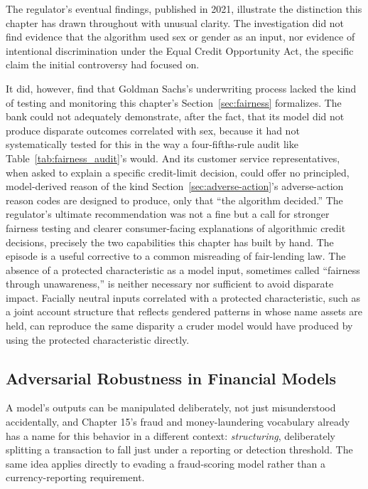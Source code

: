 \documentclass[../ai_in_finance]{subfiles}
\begin{document}
The regulator's eventual findings, published in 2021, illustrate the distinction this chapter has drawn throughout with unusual clarity. The investigation did not find evidence that the algorithm used sex or gender as an input, nor evidence of intentional discrimination under the Equal Credit Opportunity Act, the specific claim the initial controversy had focused on.

It did, however, find that Goldman Sachs's underwriting process lacked the kind of testing and monitoring this chapter's Section~\ref{sec:fairness} formalizes. The bank could not adequately demonstrate, after the fact, that its model did not produce disparate outcomes correlated with sex, because it had not systematically tested for this in the way a four-fifths-rule audit like Table~\ref{tab:fairness_audit}'s would. And its customer service representatives, when asked to explain a specific credit-limit decision, could offer no principled, model-derived reason of the kind Section~\ref{sec:adverse-action}'s adverse-action reason codes are designed to produce, only that ``the algorithm decided.'' The regulator's ultimate recommendation was not a fine but a call for stronger fairness testing and clearer consumer-facing explanations of algorithmic credit decisions, precisely the two capabilities this chapter has built by hand. The episode is a useful corrective to a common misreading of fair-lending law. The absence of a protected characteristic as a model input, sometimes called ``fairness through unawareness,'' is neither necessary nor sufficient to avoid disparate impact. Facially neutral inputs correlated with a protected characteristic, such as a joint account structure that reflects gendered patterns in whose name assets are held, can reproduce the same disparity a cruder model would have produced by using the protected characteristic directly.

\subsection{Adversarial Robustness in Financial Models}
\label{sec:adversarial-robustness}

A model's outputs can be manipulated deliberately, not just misunderstood accidentally, and Chapter 15's fraud and money-laundering vocabulary already has a name for this behavior in a different context: \emph{structuring}, deliberately splitting a transaction to fall just under a reporting or detection threshold. The same idea applies directly to evading a fraud-scoring model rather than a currency-reporting requirement.
\end{document}
